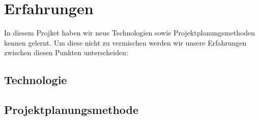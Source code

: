 \section{Erfahrungen}

In diesem Projket haben wir neue Technologien sowie Projektplanungsmethoden kennen gelernt. Um diese nicht zu vermischen werden wir unsere Erfahrungen zwischen diesen Punkten unterscheiden: 
\subsection{Technologie}
\subsection{Projektplanungsmethode}
